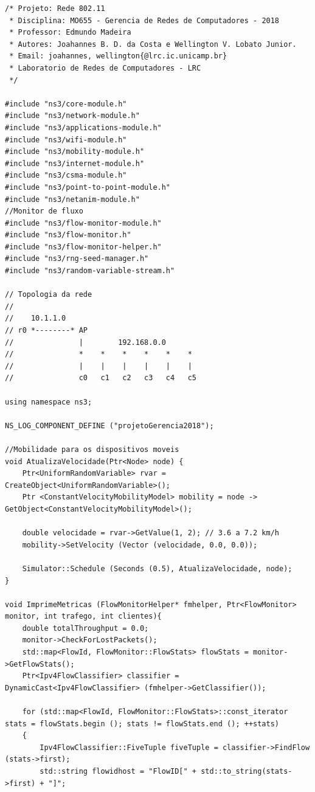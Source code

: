 \documentclass[12pt]{article}
\begin{document}
\begin{lstlisting}
/* Projeto: Rede 802.11 
 * Disciplina: MO655 - Gerencia de Redes de Computadores - 2018
 * Professor: Edmundo Madeira
 * Autores: Joahannes B. D. da Costa e Wellington V. Lobato Junior.
 * Email: joahannes, wellington{@lrc.ic.unicamp.br}
 * Laboratorio de Redes de Computadores - LRC
 */

#include "ns3/core-module.h"
#include "ns3/network-module.h"
#include "ns3/applications-module.h"
#include "ns3/wifi-module.h"
#include "ns3/mobility-module.h"
#include "ns3/internet-module.h"
#include "ns3/csma-module.h"
#include "ns3/point-to-point-module.h"
#include "ns3/netanim-module.h"
//Monitor de fluxo
#include "ns3/flow-monitor-module.h"
#include "ns3/flow-monitor.h"
#include "ns3/flow-monitor-helper.h"
#include "ns3/rng-seed-manager.h"
#include "ns3/random-variable-stream.h"

// Topologia da rede
//
//    10.1.1.0
// r0 *--------* AP
//               |        192.168.0.0
//               *    *    *    *    *    *   
//               |    |    |    |    |    |
//               c0   c1   c2   c3   c4   c5

using namespace ns3;

NS_LOG_COMPONENT_DEFINE ("projetoGerencia2018");

//Mobilidade para os dispositivos moveis
void AtualizaVelocidade(Ptr<Node> node) {
    Ptr<UniformRandomVariable> rvar = CreateObject<UniformRandomVariable>();
    Ptr <ConstantVelocityMobilityModel> mobility = node -> GetObject<ConstantVelocityMobilityModel>();
    
    double velocidade = rvar->GetValue(1, 2); // 3.6 a 7.2 km/h
    mobility->SetVelocity (Vector (velocidade, 0.0, 0.0));

    Simulator::Schedule (Seconds (0.5), AtualizaVelocidade, node);
}

void ImprimeMetricas (FlowMonitorHelper* fmhelper, Ptr<FlowMonitor> monitor, int trafego, int clientes){
	double totalThroughput = 0.0;
	monitor->CheckForLostPackets();
	std::map<FlowId, FlowMonitor::FlowStats> flowStats = monitor->GetFlowStats();
	Ptr<Ipv4FlowClassifier> classifier = DynamicCast<Ipv4FlowClassifier> (fmhelper->GetClassifier());

	for (std::map<FlowId, FlowMonitor::FlowStats>::const_iterator stats = flowStats.begin (); stats != flowStats.end (); ++stats)
	{
		Ipv4FlowClassifier::FiveTuple fiveTuple = classifier->FindFlow (stats->first);
		std::string flowidhost = "FlowID[" + std::to_string(stats->first) + "]";


\end{lstlisting}
\end{document}
